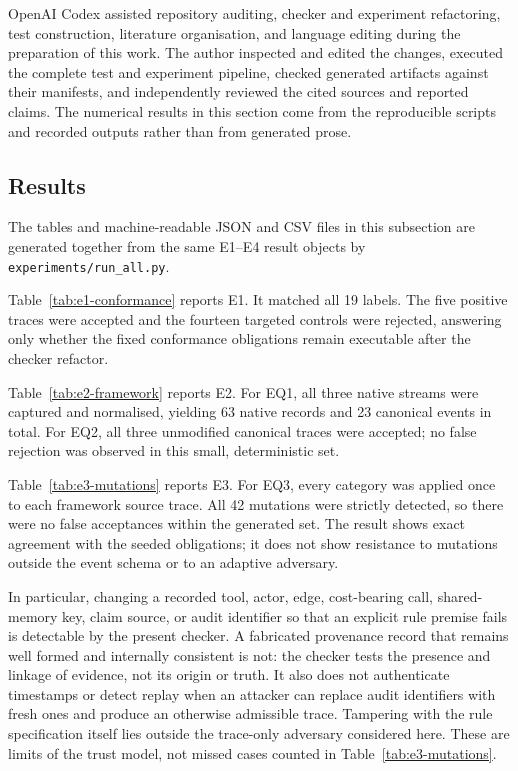 \documentclass[a4paper,fleqn]{cas-sc}
\begin{document}
OpenAI Codex assisted repository auditing, checker and experiment refactoring,
test construction, literature organisation, and language editing during the
preparation of this work. The author inspected and edited the changes, executed
the complete test and experiment pipeline, checked generated artifacts against
their manifests, and independently reviewed the cited sources and reported claims.
The numerical results in this section come from the reproducible scripts and
recorded outputs rather than from generated prose.

\subsection{Results}

The tables and machine-readable JSON and CSV files in this subsection are
generated together from the same E1--E4 result objects by
\texttt{experiments/run\_all.py}.



Table~\ref{tab:e1-conformance} reports E1. It matched all 19 labels. The five positive traces were accepted and the
fourteen targeted controls were rejected, answering only whether the fixed
conformance obligations remain executable after the checker refactor.



Table~\ref{tab:e2-framework} reports E2. For EQ1, all three native streams were captured and normalised, yielding 63
native records and 23 canonical events in total. For EQ2, all three unmodified
canonical traces were accepted; no false rejection was observed in this small,
deterministic set.



Table~\ref{tab:e3-mutations} reports E3. For EQ3, every category was applied once to each framework source trace. All 42
mutations were strictly detected, so there were no false acceptances within the
generated set. The result shows exact agreement with the seeded obligations; it
does not show resistance to mutations outside the event schema or to an
adaptive adversary.

In particular, changing a recorded tool, actor, edge, cost-bearing call,
shared-memory key, claim source, or audit identifier so that an explicit rule
premise fails is detectable by the present checker. A fabricated provenance
record that remains well formed and internally consistent is not: the checker
tests the presence and linkage of evidence, not its origin or truth. It also
does not authenticate timestamps or detect replay when an attacker can replace
audit identifiers with fresh ones and produce an otherwise admissible trace.
Tampering with the rule specification itself lies outside the trace-only
adversary considered here. These are limits of the trust model, not missed
cases counted in Table~\ref{tab:e3-mutations}.
\end{document}
